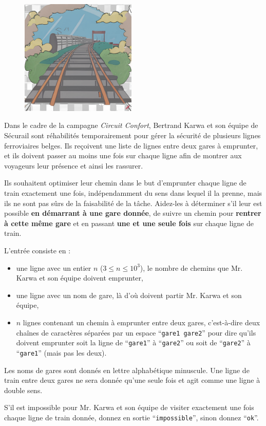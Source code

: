 \problemname{\problemyamlname}

\begin{figure}
	\centering
	\includegraphics[width=5.5cm]{railway.jpg}
\end{figure}
Dans le cadre de la campagne \emph{Circuit Confort}, Bertrand Karwa et son équipe de Sécurail sont réhabilités
temporairement pour gérer la sécurité de plusieurs lignes ferroviaires belges. Ils reçoivent une liste de lignes
entre deux gares à emprunter, et ils doivent passer au moins une fois sur chaque ligne afin de montrer aux
voyageurs leur présence et ainsi les rassurer.

Ils souhaitent optimiser leur chemin dans le but d'emprunter chaque ligne de train exactement une fois, indépendamment du sens dans lequel il la prenne, mais ils ne sont pas sûrs
de la faisabilité de la tâche. Aidez-les à déterminer s'il leur est possible \textbf{en démarrant à une gare donnée}, de suivre un chemin pour \textbf{rentrer à cette même gare} et en passant \textbf{une et une seule fois} sur chaque ligne de train.

\begin{Input}
	L'entrée consiste en :
	\begin{itemize}
		\item une ligne avec un entier $n$ ($3 \le n \le 10^3$), le nombre de chemins que Mr. Karwa et son équipe doivent emprunter,
		\item une ligne avec un nom de gare, là d'où doivent partir Mr. Karwa et son équipe,
		\item $n$ lignes contenant un chemin à emprunter entre deux gares, c'est-à-dire deux chaînes de caractères séparées par un espace ``\verb|gare1 gare2|'' pour dire qu'ils doivent emprunter soit la ligne de ``\verb|gare1|'' à ``\verb|gare2|'' ou soit de ``\verb|gare2|'' à ``\verb|gare1|'' (mais pas les deux).
	\end{itemize}
	Les noms de gares sont donnés en lettre alphabétique minuscule.
	Une ligne de train entre deux gares ne sera donnée qu'une seule fois et agit comme une ligne à double sens.
\end{Input}

\begin{Output}
	S'il est impossible pour Mr. Karwa et son équipe de visiter exactement une fois chaque ligne de train donnée, donnez en sortie ``\verb|impossible|'', sinon donnez ``\verb|ok|''.
\end{Output}
